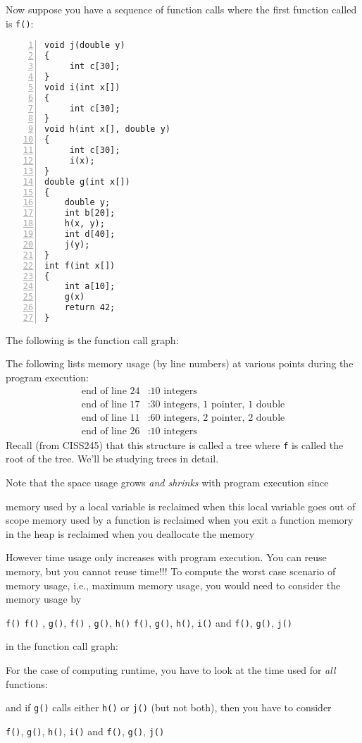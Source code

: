  


Now suppose you have a sequence of function calls where the first function
called is \verb!f()!:
\begin{Verbatim}[frame=single,fontsize=\footnotesize,numbers=left]
void j(double y)
{
     int c[30];
}
void i(int x[])
{
     int c[30];
}
void h(int x[], double y)
{
     int c[30];
     i(x);
}
double g(int x[])
{
    double y;
    int b[20];
    h(x, y);
    int d[40];
    j(y);
}
int f(int x[])
{
    int a[10];
    g(x)
    return 42;
}
\end{Verbatim}
The following is the function call graph:

The following lists memory usage (by line numbers) at various points
during the program execution:
\begin{align*}
  \text{end of line 24}&: \text{10 integers} \\
  \text{end of line 17}&: \text{30 integers, 1 pointer, 1 double} \\
  \text{end of line 11}&: \text{60 integers, 2 pointer, 2 double} \\
  \text{end of line 26}&: \text{10 integers}
\end{align*}
Recall (from CISS245) that this structure is called a tree where \verb!f! is called the root
of the tree.
We'll be studying trees in detail.

Note that the space usage grows \textit{and shrinks} with program execution since
\begin{enumerate}[nosep]
  \li
  memory used by a local variable is reclaimed when this local variable
  goes out of scope
  \li
  memory used by a function is reclaimed when you exit a function
  \li 
  memory in the heap is reclaimed when you deallocate the memory
\end{enumerate}
However time usage only increases with program execution.
You can reuse memory, but you cannot reuse time!!!
To compute the worst case scenario of memory usage, i.e., maximum memory usage,
you would need to consider the
memory usage by
\begin{enumerate}[nosep]  
  \li \verb!f()!
  \li \verb!f()! , \verb!g()!, 
  \li \verb!f()! , \verb!g()!, \verb!h()!
  \li \verb!f()!, \verb!g()!, \verb!h()!, \verb!i()! and
  \li \verb!f()!, \verb!g()!, \verb!j()!
\end{enumerate}
in the function call graph:

For the case of computing runtime, you have to look at the time used
for \textit{all} functions:

and if \verb!g()! calls either \verb!h()! or \verb!j()! (but not both),
then you have to consider
\begin{enumerate}[nosep]  
  \li \verb!f()!, \verb!g()!, \verb!h()!, \verb!i()! and
  \li \verb!f()!, \verb!g()!, \verb!j()!
\end{enumerate}

